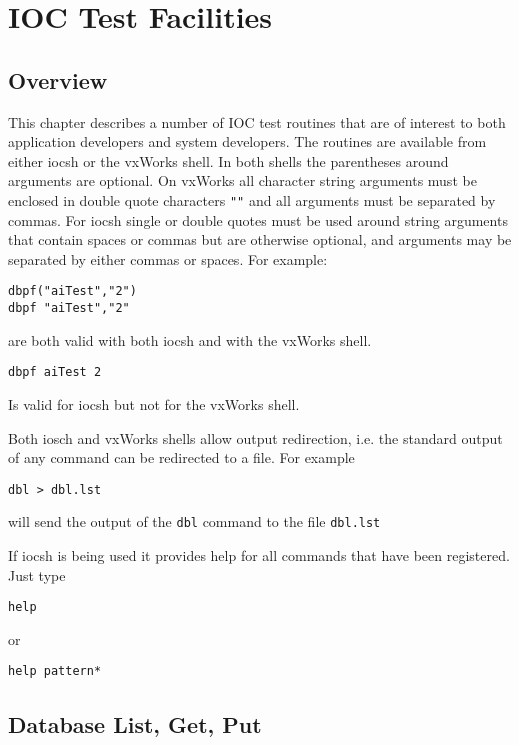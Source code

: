 





\chapter{IOC Test Facilities}

\section{Overview}

This chapter describes a number of IOC test routines that are of interest to both application developers and system 
developers. The routines are available from either iocsh or the vxWorks shell. In both shells the parentheses around 
arguments are optional. On vxWorks all character string arguments must be enclosed in double quote characters \verb|""| and 
all arguments must be separated by commas. For iocsh single or double quotes must be used around string arguments that 
contain spaces or commas but are otherwise optional, and arguments may be separated by either commas or spaces. For 
example:

\begin{verbatim}dbpf("aiTest","2")
dbpf "aiTest","2"
\end{verbatim}are both valid with both iocsh and with the vxWorks shell.

\begin{verbatim}dbpf aiTest 2
\end{verbatim}Is valid for iocsh but not for the vxWorks shell.

Both iosch and vxWorks shells allow output redirection, i.e. the standard output of any command can be redirected to a 
file. For example

\begin{verbatim}dbl > dbl.lst
\end{verbatim}will send the output of the \verb|dbl| command to the file \verb|dbl.lst|

If iocsh is being used it provides help for all commands that have been registered. Just type

\begin{verbatim}help
\end{verbatim}or

\begin{verbatim}help pattern*
\end{verbatim}\section{Database List, Get, Put}

